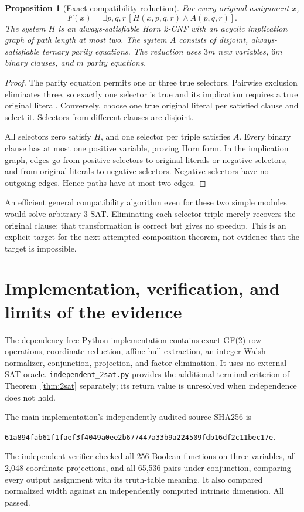 \documentclass[11pt]{article}
\newtheorem{proposition}[theorem]{Proposition}
\begin{document}
\begin{proposition}[Exact compatibility reduction]
For every original assignment $x$,
\[
 F(x)=\exists p,q,r\,[H(x,p,q,r)\land A(p,q,r)].
\]
The system $H$ is an always-satisfiable Horn 2-CNF with an acyclic implication
graph of path length at most two. The system $A$ consists of disjoint, always-
satisfiable ternary parity equations. The reduction uses $3m$ new variables,
$6m$ binary clauses, and $m$ parity equations.
\end{proposition}
\begin{proof}
The parity equation permits one or three true selectors. Pairwise exclusion
eliminates three, so exactly one selector is true and its implication requires a
true original literal. Conversely, choose one true original literal per satisfied
clause and select it. Selectors from different clauses are disjoint.

All selectors zero satisfy $H$, and one selector per triple satisfies $A$.
Every binary clause has at most one positive variable, proving Horn form. In
the implication graph, edges go from positive selectors to original literals
or negative selectors, and from original literals to negative selectors.
Negative selectors have no outgoing edges. Hence paths have at most two edges.
\end{proof}

An efficient general compatibility algorithm even for these two simple modules
would solve arbitrary 3-SAT. Eliminating each selector triple merely recovers the
original clause; that transformation is correct but gives no speedup. This is
an explicit target for the next attempted composition theorem, not evidence
that the target is impossible.

\section{Implementation, verification, and limits of the evidence}
The dependency-free Python implementation contains exact GF(2) row operations,
coordinate reduction, affine-hull extraction, an integer Walsh normalizer,
conjunction, projection, and factor elimination. It uses no external SAT oracle.
\texttt{independent\_2sat.py} provides the additional terminal criterion of
Theorem~\ref{thm:2sat} separately; its return value is unresolved when independence
does not hold.

The main implementation's independently audited source SHA256 is
\begin{center}\small
\texttt{61a894fab61f1faef3f4049a0ee2b677447a33b9a224509fdb16df2c11bec17e}.
\end{center}
The independent verifier checked all 256 Boolean functions on three variables,
all 2,048 coordinate projections, and all 65,536 pairs under conjunction,
comparing every output assignment with its truth-table meaning. It also compared
normalized width against an independently computed intrinsic dimension. All passed.
\end{document}
